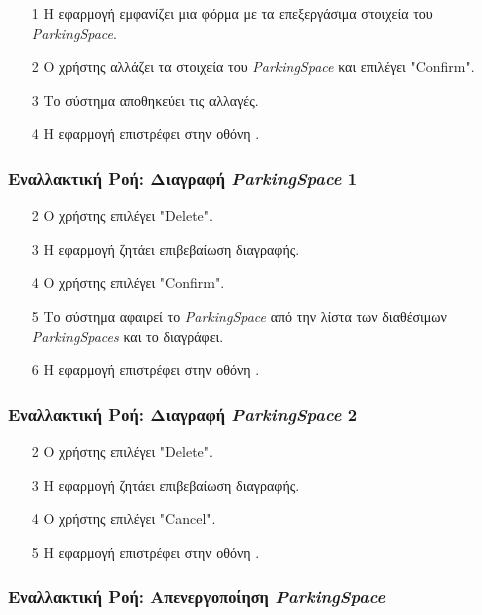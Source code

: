 \begin{enumerate}
    \item[1] Η εφαρμογή εμφανίζει μια φόρμα με τα επεξεργάσιμα στοιχεία του
        \textit{ParkingSpace}.
    \item[2] Ο χρήστης αλλάζει τα στοιχεία του \textit{ParkingSpace} και
        επιλέγει "Confirm".
    \item[3] Το σύστημα αποθηκεύει τις αλλαγές.
    \item[4] Η εφαρμογή επιστρέφει στην οθόνη .
\end{enumerate}

\subsubsection{Εναλλακτική Ροή: Διαγραφή \textit{ParkingSpace} 1}

\begin{enumerate}
    \item[2] Ο χρήστης επιλέγει "Delete".
    \item[3] Η εφαρμογή ζητάει επιβεβαίωση διαγραφής.
    \item[4] Ο χρήστης επιλέγει "Confirm".
    \item[5] Το σύστημα αφαιρεί το \textit{ParkingSpace} από την λίστα των
        διαθέσιμων \textit{ParkingSpaces} και το διαγράφει.
    \item[6] Η εφαρμογή επιστρέφει στην οθόνη .
\end{enumerate}

\subsubsection{Εναλλακτική Ροή: Διαγραφή \textit{ParkingSpace} 2}

\begin{enumerate}
    \item[2] Ο χρήστης επιλέγει "Delete".
    \item[3] Η εφαρμογή ζητάει επιβεβαίωση διαγραφής.
    \item[4] Ο χρήστης επιλέγει "Cancel".
    \item[5] Η εφαρμογή επιστρέφει στην οθόνη .
\end{enumerate}

\subsubsection{Εναλλακτική Ροή: Απενεργοποίηση \textit{ParkingSpace}}

